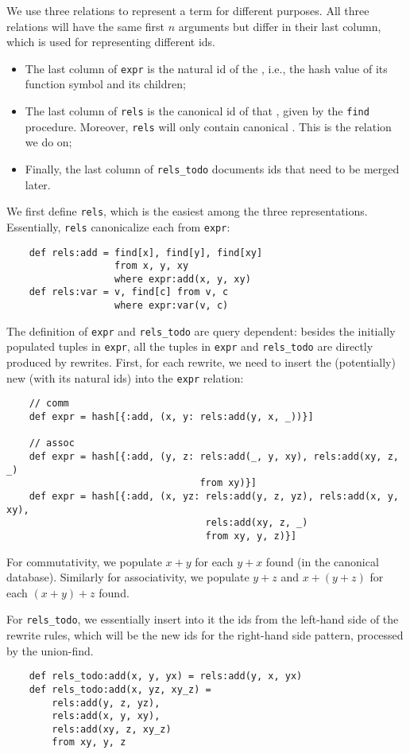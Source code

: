 We use three relations to represent a term for different purposes.
All three relations will have the same first $n$ arguments but 
 differ in their last column, which is used for representing different ids.
\begin{itemize}
    \item The last column of \verb|expr| is the natural id of the \enode, 
    i.e., the hash value of its function symbol and its children;
    \item The last column of \verb|rels| is the canonical id of that \enode,
    given by the \verb|find| procedure. 
    Moreover, \verb|rels| will only contain canonical \enodes.
    This is the relation we do \ematching on;
    \item Finally, the last column of \verb|rels_todo| documents
    \eclass ids that need to be merged later.
\end{itemize}

We first define \verb|rels|, which is the easiest among the three representations.
Essentially, \verb|rels| canonicalize each \enode from \verb|expr|:
\begin{verbatim}
    def rels:add = find[x], find[y], find[xy] 
                   from x, y, xy 
                   where expr:add(x, y, xy)
    def rels:var = v, find[c] from v, c 
                   where expr:var(v, c)
\end{verbatim}

The definition of \verb|expr| and \verb|rels_todo| are query dependent:
 besides the initially populated tuples in \verb|expr|, 
 all the tuples in \verb|expr| and \verb|rels_todo| 
 are directly produced by rewrites.
First, for each rewrite, we need to insert the (potentially) new \enodes
 (with its natural ids) into the \verb|expr| relation:
\begin{verbatim}
    // comm
    def expr = hash[{:add, (x, y: rels:add(y, x, _))}]

    // assoc
    def expr = hash[{:add, (y, z: rels:add(_, y, xy), rels:add(xy, z, _) 
                                  from xy)}]
    def expr = hash[{:add, (x, yz: rels:add(y, z, yz), rels:add(x, y, xy), 
                                   rels:add(xy, z, _) 
                                   from xy, y, z)}]
\end{verbatim}
For commutativity, we populate $x + y$ for each $y + x$ found (in the canonical database).
Similarly for associativity, we populate $y +z$ and $x+(y+z)$ for each 
 $(x+y)+z$ found.

For \verb|rels_todo|, we essentially insert into it the \eclass ids 
 from the left-hand side of the rewrite rules, which will be the new \eclass ids
 for the right-hand side pattern, processed by the union-find.
\begin{verbatim}
    def rels_todo:add(x, y, yx) = rels:add(y, x, yx)
    def rels_todo:add(x, yz, xy_z) = 
        rels:add(y, z, yz), 
        rels:add(x, y, xy), 
        rels:add(xy, z, xy_z) 
        from xy, y, z
\end{verbatim}

